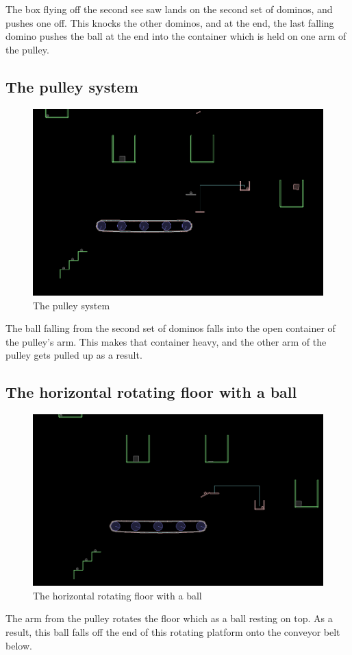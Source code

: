 \documentclass[a4paper,11pt]{article}
\begin{document}
	The box flying off the second see saw lands on the second set of dominos, and pushes one off. This knocks the other dominos, and at the end, the last falling domino pushes the ball at the end into the container which is held on one arm of the pulley.

    \subsection{The pulley system}
  	\begin{figure}
	\includegraphics[scale=0.35]{12_ball_lands_in_pulley.png}
	\caption{The pulley system}
	\end{figure}  

	The ball falling from the second set of dominos falls into the open container of the pulley's arm. This makes that container heavy,
and the other arm of the pulley gets pulled up as a result.

  \subsection{The horizontal rotating floor with a ball}
  	\begin{figure}
	\includegraphics[scale=0.35]{13_rotating_platform_impact.png}
	\caption{The horizontal rotating floor with a ball}
	\end{figure}  
	The arm from the pulley rotates the floor which as a ball resting on top. As a result, this ball falls off the end of this rotating 
platform onto the conveyor belt below.
\end{document}
